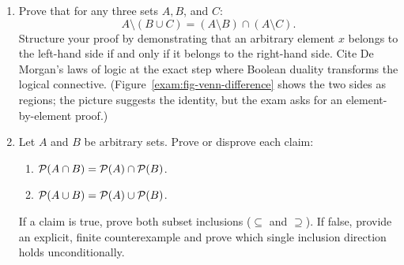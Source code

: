 \begin{enumerate}[resume]
  \item Prove that for any three sets $A, B$, and $C$:
  \[
  A \setminus (B \cup C) = (A \setminus B) \cap (A \setminus C).
  \]
  Structure your proof by demonstrating that an arbitrary element $x$ belongs to the left-hand side if and only if it belongs to the right-hand side. Cite De Morgan's laws of logic at the exact step where Boolean duality transforms the logical connective. (Figure~\ref{exam:fig-venn-difference} shows the two sides as regions; the picture suggests the identity, but the exam asks for an element-by-element proof.)
  \item Let $A$ and $B$ be arbitrary sets. Prove or disprove each claim:
  \begin{enumerate}
    \item $\mathcal{P}(A \cap B) = \mathcal{P}(A) \cap \mathcal{P}(B)$.
    \item $\mathcal{P}(A \cup B) = \mathcal{P}(A) \cup \mathcal{P}(B)$.
  \end{enumerate}
  If a claim is true, prove both subset inclusions ($\subseteq$ and $\supseteq$). If false, provide an explicit, finite counterexample and prove which single inclusion direction holds unconditionally.
\end{enumerate}

